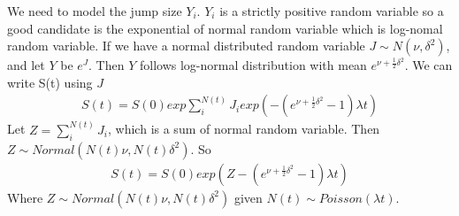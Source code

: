 \documentclass[a4paper]{article}
\begin{document}
We need to model the jump size $Y_i$. $Y_i$ is a strictly positive random variable so a good candidate is the exponential of normal random variable which is log-nomal random variable. If we have a normal distributed random variable $J \sim N(\nu, \delta^2)$, and let $Y$ be $e^{J}$. Then $Y$ follows log-normal distribution with mean $e^{\nu + \frac{1}{2}\delta^2}$. We can write S(t) using $J$
\begin{align*}
	S(t) = S(0) exp{\sum_i^{N(t)} J_i} exp(-(e^{\nu + \frac{1}{2}\delta^2}-1) \lambda t) 
\end{align*}
Let $Z = \sum_i^{N(t)} J_i$, which is a sum of normal random variable. Then $Z \sim Normal(N(t)\nu, N(t)\delta^2)$. So
\begin{align*}
	S(t) = S(0) exp{(Z -(e^{\nu + \frac{1}{2}\delta^2}-1) \lambda t)} 
\end{align*}
Where $ Z \sim Normal(N(t)\nu, N(t)\delta^2)$ given $N(t) \sim Poisson(\lambda t)$.\\
\end{document}
